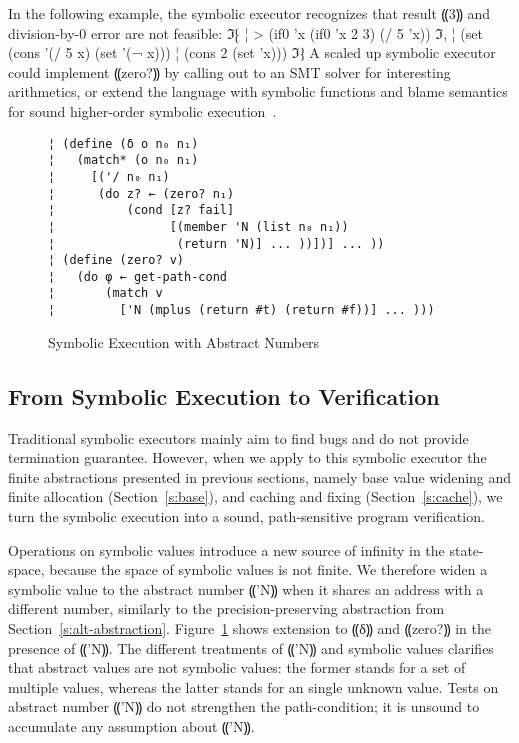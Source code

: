 In the following example, the symbolic executor recognizes that result ⸨3⸩ and
division-by-0 error are not feasible:
ℑ⁅
¦ > (if0 'x (if0 'x 2 3) (/ 5 'x))
ℑ,
¦ (set (cons '(/ 5 x) (set '(¬ x)))
¦      (cons 2 (set 'x)))
ℑ⁆
A scaled up symbolic executor could implement ⸨zero?⸩ by calling out to an SMT
solver for interesting arithmetics, or extend the language with symbolic
functions and blame semantics for sound higher-order symbolic
execution~\cite{dvanhorn:TobinHochstadt2012Higherorder,dvanhorn:Nguyen2015Relatively}.

\begin{figure} %
\begin{lstlisting}
¦ (define (δ o n₀ n₁)
¦   (match* (o n₀ n₁)
¦     [('/ n₀ n₁)
¦      (do z? ← (zero? n₁)
¦          (cond [z? fail]
¦                [(member 'N (list n₀ n₁))
¦                 (return 'N)] ... ))])] ... ))
¦ (define (zero? v)
¦   (do φ ← get-path-cond
¦       (match v 
¦         ['N (mplus (return #t) (return #f))] ... )))
\end{lstlisting}
\vspace{-0.75em}
\caption{Symbolic Execution with Abstract Numbers}
\label{f:symbolic-widen}
\vspace{-1em}
\end{figure} %

\subsection{From Symbolic Execution to Verification}

Traditional symbolic executors mainly aim to find bugs and do not provide
termination guarantee. However, when we apply to this symbolic executor the
finite abstractions presented in previous sections, namely base value widening
and finite allocation (Section~\ref{s:base}), and caching and fixing
(Section~\ref{s:cache}), we turn the symbolic execution into a sound,
path-sensitive program verification.

Operations on symbolic values introduce a new source of infinity in the
state-space, because the space of symbolic values is not finite. We therefore
widen a symbolic value to the abstract number ⸨'N⸩ when it shares an address
with a different number, similarly to the precision-preserving abstraction from
Section~\ref{s:alt-abstraction}. Figure~\ref{f:symbolic-widen} shows extension
to ⸨δ⸩ and ⸨zero?⸩ in the presence of ⸨'N⸩. The different treatments of ⸨'N⸩
and symbolic values clarifies that abstract values are not symbolic values: the
former stands for a set of multiple values, whereas the latter stands for an
single unknown value. Tests on abstract number ⸨'N⸩ do not strengthen the
path-condition; it is unsound to accumulate any assumption about ⸨'N⸩.

